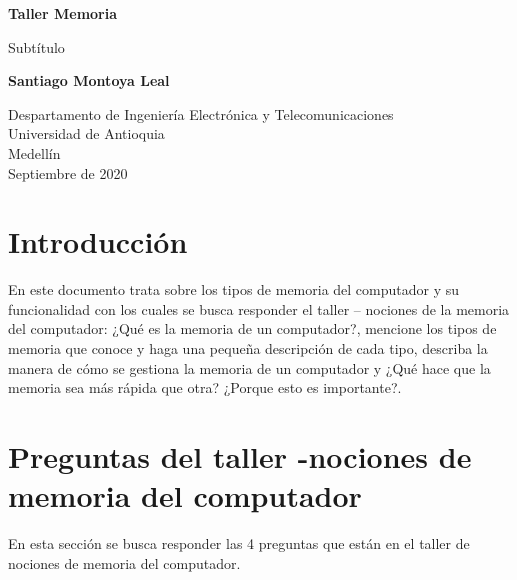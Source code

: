 \documentclass{article}
\begin{document}
\begin{titlepage}
    \begin{center}
        \vspace*{1cm}
            
        \Huge
        \textbf{Taller Memoria}
            
        \vspace{0.5cm}
        \LARGE
        Subtítulo
            
        \vspace{1.5cm}
            
        \textbf{Santiago Montoya Leal}
            
        \vfill
            
        \vspace{0.8cm}
            
        \Large
        Despartamento de Ingeniería Electrónica y Telecomunicaciones\\
        Universidad de Antioquia\\
        Medellín\\
        Septiembre de 2020
            
    \end{center}
\end{titlepage}

\tableofcontents
\newpage
\section{Introducción}\label{intro}
En este documento trata sobre los tipos de memoria del computador y su funcionalidad con los cuales se busca responder el taller – nociones de la memoria del computador: ¿Qué es la memoria de un computador?, mencione los tipos de memoria que conoce y haga una pequeña descripción de cada tipo, describa la manera de cómo se gestiona la memoria de un computador y ¿Qué hace que la memoria sea más rápida que otra? ¿Porque esto es importante?.

\section{Preguntas del taller -nociones de memoria del computador} \label{contenido}
En esta sección se busca responder las 4 preguntas que están en el taller de nociones de memoria del computador.
\end{document}
